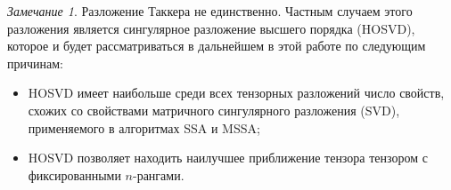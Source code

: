 \documentclass[specialist,
  substylefile=spbu_report.rtx,
subf,href,colorlinks=true, 12pt]{disser}
\theoremstyle{plain}
\theoremstyle{definition}
\newtheorem{definition}{Определение}[section]
\theoremstyle{remark}
\newtheorem{remark}{Замечание}[section]
\begin{document}
\begin{remark}
  Разложение Таккера не единственно.
  Частным случаем этого разложения является сингулярное разложение
  высшего порядка (HOSVD),
  которое и будет рассматриваться в дальнейшем в этой работе по
  следующим причинам:
  \begin{itemize}
    \item HOSVD имеет наибольше среди всех тензорных разложений
      число свойств, схожих со свойствами матричного сингулярного
      разложения (SVD),
      применяемого в алгоритмах SSA и MSSA;
    \item HOSVD позволяет находить наилучшее приближение тензора тензором с
      фиксированными $n$-рангами.
  \end{itemize}
\end{remark}

\end{document}
